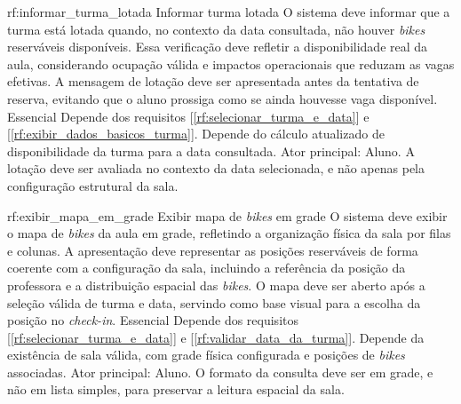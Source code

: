 \reqfuncfull
{rf:informar_turma_lotada}
{Informar turma lotada}
{O sistema deve informar que a turma está lotada quando, no contexto da data consultada, não houver \textit{bikes} reserváveis disponíveis. Essa verificação deve refletir a disponibilidade real da aula, considerando ocupação válida e impactos operacionais que reduzam as vagas efetivas. A mensagem de lotação deve ser apresentada antes da tentativa de reserva, evitando que o aluno prossiga como se ainda houvesse vaga disponível.}
{Essencial}
{Depende dos requisitos [\ref{rf:selecionar_turma_e_data}] e [\ref{rf:exibir_dados_basicos_turma}]. Depende do cálculo atualizado de disponibilidade da turma para a data consultada.}
{Ator principal: Aluno. A lotação deve ser avaliada no contexto da data selecionada, e não apenas pela configuração estrutural da sala.}

\reqfuncfull
{rf:exibir_mapa_em_grade}
{Exibir mapa de \textit{bikes} em grade}
{O sistema deve exibir o mapa de \textit{bikes} da aula em grade, refletindo a organização física da sala por filas e colunas. A apresentação deve representar as posições reserváveis de forma coerente com a configuração da sala, incluindo a referência da posição da professora e a distribuição espacial das \textit{bikes}. O mapa deve ser aberto após a seleção válida de turma e data, servindo como base visual para a escolha da posição no \textit{check-in}.}
{Essencial}
{Depende dos requisitos [\ref{rf:selecionar_turma_e_data}] e [\ref{rf:validar_data_da_turma}]. Depende da existência de sala válida, com grade física configurada e posições de \textit{bikes} associadas.}
{Ator principal: Aluno. O formato da consulta deve ser em grade, e não em lista simples, para preservar a leitura espacial da sala.}

